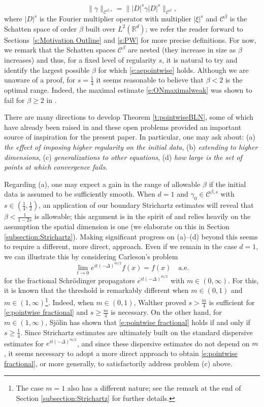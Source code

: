\documentclass[a4paper]{amsart}
\numberwithin{equation}{section}%
\theoremstyle{plain}%
\theoremstyle{definition}
\theoremstyle{remark}%
\def\ae{\mathrm{a.e.}}
\def\C{\mathcal{C}}
\def\C{\mathcal{C}}
\begin{document}
\[
\|\gamma\|_{\C^{\beta,s}} = \||D|^s \gamma |D|^s \|_{\C^{\beta}},
\]
where $|D|^s$ is the Fourier multiplier operator with multiplier $|\xi|^s$ and $\mathcal{C}^\beta$ is the Schatten space of order $\beta$ built over $L^2(\mathbb{R}^d)$; we refer the reader forward to Sections~\ref{s:Motivation Outline} and \ref{s:PW} for more precise definitions. For now, we remark that the Schatten spaces $\mathcal{C}^\beta$ are nested (they increase in size as $\beta$ increases) and thus, for a fixed level of regularity $s$, it is natural to try and identify the largest possible $\beta$ for which \eqref{e:aepointwise} holds. Although we are unaware of a proof, for $s = \frac{1}{4}$ it seems reasonable to believe that $\beta < 2$ is the optimal range. Indeed, the maximal estimate \eqref{e:ONmaximalweak} was shown to fail for $\beta \geq 2$ in \cite{BLN_Selecta}.

There are many directions to develop Theorem \ref{t:pointwiseBLN}, some of which have already been raised in \cite{BLN_Selecta} and these open problems provided an important source of inspiration for the present paper. 
In particular, one may ask about: (a) \emph{the effect of imposing higher regularity on the initial data},  (b) \emph{extending to higher dimensions}, (c) \emph{generalizations to other equations}, (d) \emph{how large is the set of points at which convergence fails}.


Regarding (a), one may expect a gain in the range of allowable $\beta$ if the initial data is assumed to be sufficiently smooth. When $d = 1$ and $\gamma_0 \in \mathcal{C}^{\beta,s}$ with $s \in (\frac{1}{4},\frac{1}{2})$, an application of our boundary Strichartz estimates will reveal that $\beta < \frac{1}{1-2s}$ is allowable; this argument is in the spirit of \cite{BLN_Selecta} and relies heavily on the assumption the spatial dimension is one (we elaborate on this in Section \ref{subsection:Strichartz}). Making significant progress on (a)--(d) beyond this seems to require a different, more direct, approach. Even if we remain in the case $d = 1$, we can illustrate this by considering Carleson's problem
\begin{equation}\label{e:pointwise fractional}
    \lim_{t\to0}e^{it(-\Delta)^{m/2}}f(x)
    =
    f(x)\quad\ae
\end{equation}
for the fractional Schr\"{o}dinger propagators $e^{it(-\Delta)^{m/2}}$ with $m\in(0,\infty)$. For this, it is known that the threshold is remarkably different when $m\in(0,1)$ and $m \in (1,\infty)$\footnote{The case $m = 1$ also has a different nature; see the remark at the end of Section \ref{subsection:Strichartz} for further details.}. Indeed, when $m \in (0,1)$, Walther \cite{Wl97} proved $s>\frac m4$ is sufficient for \eqref{e:pointwise fractional} and $s\geq\frac m4$ is necessary. On the other hand, for $m \in (1,\infty)$, Sj\"{o}lin \cite{Sj87} has shown that \eqref{e:pointwise fractional} holds if and only if $s\geq\frac14$. Since Strichartz estimates are ultimately built on the standard dispersive estimates for $e^{it(-\Delta)^{m/2}}$, and since these dispersive estimates do not depend on $m$, it seems necessary to adopt a more direct approach to obtain \eqref{e:pointwise fractional}, or more generally, to satisfactorily address problem (c) above.  
\end{document}
